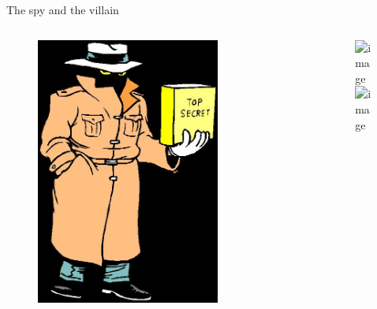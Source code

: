 \documentclass{beamer}
\begin{document}
\setcounter{framenumber}{20}
\begin{frame}{{\color{white}\hspace{164pt}The spy and the villain}}
\begin{columns}

\begin{column}{.35\linewidth}
\begin{figure}[h]
\includegraphics[width=0.9\linewidth]{pic10_21_1.jpg}
\end{figure}
\end{column}
		
\begin{column}{.3\linewidth}
\begin{figure}[h]
\vspace{-30pt}
\includegraphics<3,4>[width=0.95\linewidth]{pic10_21_2.png}
\end{figure}
\end{column}
		
\begin{column}{.35\linewidth}
\begin{figure}[h]
\includegraphics<2,3>[width=0.9\linewidth]{pic10_21_3.jpg}
\includegraphics<4>[width=0.9\linewidth]{pic10_21_4.jpg}
\end{figure}
\end{column}

\end{columns}
\end{frame}
\end{document}
